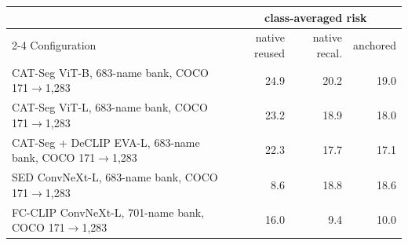 \begin{tabular}{@{}lrrr@{}}
\toprule
& \multicolumn{3}{c}{class-averaged risk} \\
\cmidrule(l){2-4}
Configuration & native reused & native recal. & anchored \\
\midrule
CAT-Seg ViT-B, 683-name bank, COCO 171$\to$1,283 & 24.9 & 20.2 & 19.0 \\
CAT-Seg ViT-L, 683-name bank, COCO 171$\to$1,283 & 23.2 & 18.9 & 18.0 \\
CAT-Seg + DeCLIP EVA-L, 683-name bank, COCO 171$\to$1,283 & 22.3 & 17.7 & 17.1 \\
SED ConvNeXt-L, 683-name bank, COCO 171$\to$1,283 & 8.6 & 18.8 & 18.6 \\
FC-CLIP ConvNeXt-L, 701-name bank, COCO 171$\to$1,283 & 16.0 & 9.4 & 10.0 \\
\bottomrule
\end{tabular}
